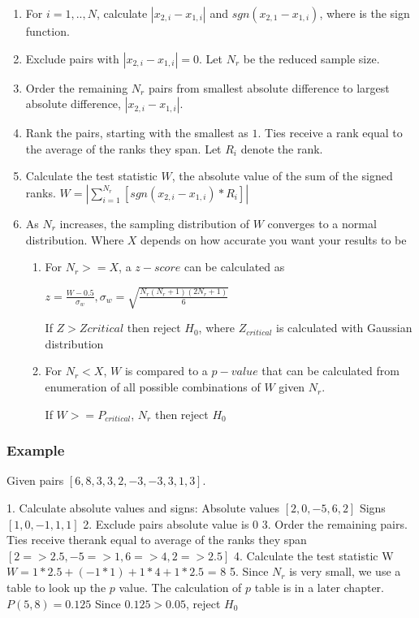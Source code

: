 \documentclass[12pt]{article}
\begin{document}
\begin{enumerate}
\item
For $i=1, .., N$, calculate $|x_{2,i} - x_{1,i}|$ and $sgn(x_{2,1} - x_{1,i})$, where  is the sign function.
\item
Exclude pairs with $|x_{2,i} - x_{1,i}| = 0$. Let $N_r$ be the reduced sample size.
\item
Order the remaining $N_r$  pairs from smallest absolute difference to largest absolute difference, $|x_{2,i} - x_{1,i}|$.
\item
Rank the pairs, starting with the smallest as $1$. Ties receive a rank equal to the average of the ranks they span. Let $R_i$ denote the rank.
\item
Calculate the test statistic $W$, the absolute value of the sum of the signed ranks. $W=|\sum\limits_{i=1}^{N_r} [sgn(x_{2,i} - x_{1,i})*R_i]|$
\item
As $N_r$ increases, the sampling distribution of $W$ converges to a normal distribution. Where $X$ depends on how accurate you want your results to be
\begin{enumerate}
\item
For $N_r >= X$, a $z-score$ can be calculated as

$z=\frac{W-0.5}{\sigma_w},\sigma_w = \sqrt{\frac{N_r(N_r + 1)(2N_r + 1)}{6}}$

If $Z > Zcritical$ then reject $H_0$, where $Z_{critical}$ is calculated with Gaussian distribution

\item
For $N_r < X$, $W$  is compared to a $p-value$ that can be calculated from enumeration of all possible combinations of $W$ given $N_r$.

If $W >= P_{critical}$, $N_r$ then reject $H_0$
\end{enumerate}
\end{enumerate}

\subsubsection{Example}
Given pairs $[{6, 8}, {3, 3}, {2, -3}, {-3, 3}, {1, 3}]$.

1. Calculate absolute values and signs:
Absolute values $[2, 0, -5, 6, 2]$
Signs $[1, 0, -1, 1, 1]$
2. Exclude pairs absolute value is $0$
3. Order the remaining pairs. Ties receive therank equal to average of the ranks they span
$[{2 => 2.5}, {-5 => 1}, {6 => 4}, {2 => 2.5}]$
4. Calculate the test statistic W
$W = 1*2.5 + (-1*1) + 1*4 + 1*2.5$ = 8
5. Since $N_r$ is very small, we use a table to look up the $p$ value. The calculation of $p$ table is in a later chapter.
$P(5, 8) = 0.125$
Since $0.125 > 0.05$, reject $H_0$
\end{document}
